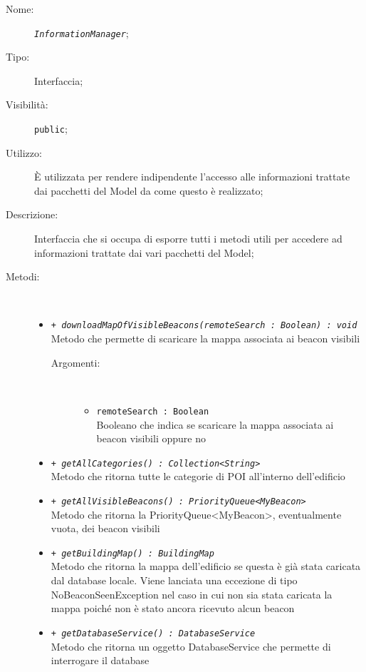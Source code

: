 \documentclass[../DefinizioneDiProdotto.tex]{subfiles}
\begin{document}
\begin{description}
	\item[Nome:] \texttt{\textit{InformationManager}};
	\item[Tipo:] Interfaccia;
	\item[Visibilità:] \texttt{public};
	\item[Utilizzo:] È utilizzata per rendere indipendente l'accesso alle informazioni trattate dai pacchetti del Model da come questo è realizzato;
	\item[Descrizione:] Interfaccia che si occupa di esporre tutti i metodi utili per accedere ad informazioni trattate dai vari pacchetti del Model;
	\item[Metodi:] \
	\begin{itemize}
		\item \texttt{+ \textit{downloadMapOfVisibleBeacons(remoteSearch : Boolean) : void}}\\
		Metodo che permette di scaricare la mappa associata ai beacon visibili
		\begin{description}
			\item[Argomenti:] \
			\begin{itemize}
				\item \texttt{remoteSearch : Boolean}\\
				Booleano che indica se scaricare la mappa associata ai beacon visibili oppure no\end{itemize}
		\end{description}
		\item \texttt{+ \textit{getAllCategories() : Collection<String>}}\\
		Metodo che ritorna tutte le categorie di POI all'interno dell'edificio
		\item \texttt{+ \textit{getAllVisibleBeacons() : PriorityQueue<MyBeacon>}}\\
		Metodo che ritorna la PriorityQueue<MyBeacon>, eventualmente vuota, dei beacon visibili
		\item \texttt{+ \textit{getBuildingMap() : BuildingMap}}\\
		Metodo che ritorna la mappa dell'edificio se questa è già stata caricata dal database locale. Viene lanciata una eccezione di tipo NoBeaconSeenException nel caso in cui non sia stata caricata la mappa poiché non è stato ancora ricevuto alcun beacon
		\item \texttt{+ \textit{getDatabaseService() : DatabaseService}}\\
		Metodo che ritorna un oggetto DatabaseService che permette di interrogare il database

\end{itemize}
\end{description}
\end{document}

